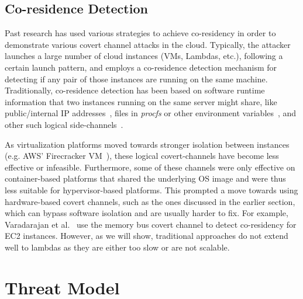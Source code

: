 \subsection{Co-residence Detection}
\label{sec:background:pastwork}

 Past research has used various strategies to achieve co-residency in order 
to demonstrate various covert channel attacks in the cloud. Typically, the
attacker launches a large number of cloud instances (VMs, Lambdas, etc.),
following a certain launch pattern, and employs a co-residence detection
mechanism for detecting if any pair of those instances are running on the same
machine. Traditionally, co-residence detection has been based on software
runtime information that two instances running on the same server might share,
like public/internal IP addresses~\cite{ristenpartccs2009}, files in
\textit{procfs} or other environment
variables~\cite{wangusenix2018,wuusenix2012}, and other such logical
side-channels~\cite{varad191016,vmplacement}.

As virtualization platforms moved towards stronger isolation between instances (e.g.
AWS' Firecracker VM~\cite{firecracker}), these logical covert-channels have
become less effective or infeasible. Furthermore, some of these channels were
only effective on container-based platforms that shared the underlying OS image
and were thus less suitable for hypervisor-based platforms.  This prompted a
move towards using hardware-based covert channels, such as the ones discussed in
the earlier section, which can bypass software isolation and are usually harder
to fix. For example, Varadarajan et al.~\cite{varadarajan2015} use the memory
bus covert channel to detect co-residency for EC2 instances.  However, as we
will show, traditional approaches do not extend well to lambdas as they are either too
slow or are not scalable. 


\section{Threat Model}
\label{sec:attackstrategy}

